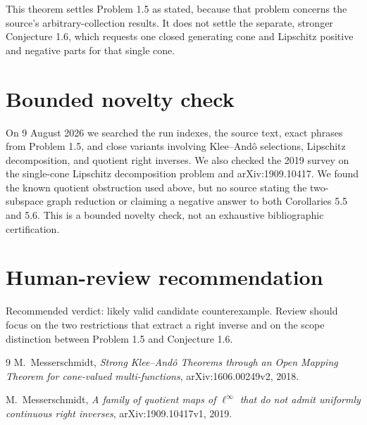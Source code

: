 \documentclass[11pt]{article}
\begin{document}
This theorem settles Problem 1.5 as stated, because that problem concerns the
source's arbitrary-collection results.  It does not settle the separate,
stronger Conjecture 1.6, which requests one closed generating cone and
Lipschitz positive and negative parts for that single cone.

\section{Bounded novelty check}

On 9 August 2026 we searched the run indexes, the source text, exact phrases
from Problem 1.5, and close variants involving Klee--And\^o selections,
Lipschitz decomposition, and quotient right inverses.  We also checked the
2019 survey on the single-cone Lipschitz decomposition problem and
arXiv:1909.10417.  We found the known quotient obstruction used above, but no
source stating the two-subspace graph reduction or claiming a negative answer
to both Corollaries 5.5 and 5.6.  This is a bounded novelty check, not an
exhaustive bibliographic certification.

\section{Human-review recommendation}

Recommended verdict: likely valid candidate counterexample.  Review should
focus on the two restrictions that extract a right inverse and on the scope
distinction between Problem 1.5 and Conjecture 1.6.

\begin{thebibliography}{9}
M.~Messerschmidt,
\emph{Strong Klee--And\^o Theorems through an Open Mapping Theorem for
cone-valued multi-functions}, arXiv:1606.00249v2, 2018.

M.~Messerschmidt,
\emph{A family of quotient maps of $\ell^\infty$ that do not admit uniformly
continuous right inverses}, arXiv:1909.10417v1, 2019.
\end{thebibliography}
\end{document}
